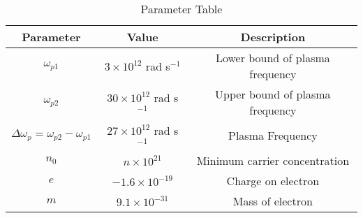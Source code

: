 \begin{table}[ht]
	  \centering
	    \begin{tabular}{|c|c|c|}
		        \hline
			   \textbf{ Parameter} & \textbf{Value} & \textbf{Description} \\
			       \hline
			           $\omega_{p1}$ & $3 \times 10^{12}$ rad s$^{-1}$ & Lower bound of plasma frequency \\
				       \hline
				            $\omega_{p2}$ & $30 \times 10^{12}$ rad s$^{-1}$ & Upper bound of plasma frequency \\
					        \hline
						    $\Delta\omega_p = \omega_{p2} - \omega_{p1}$  & $27 \times 10^{12}$ rad s$^{-1}$ & Plasma Frequency  \\
						        \hline
							    $n_0$ &  $n \times 10^{21}$ &  Minimum carrier concentration \\
							        \hline
								    $e$ &  $-1.6 \times 10^{-19}$ & Charge on electron \\
								        \hline
									    $m$ & $9.1 \times 10^{-31}$ & Mass of electron \\
									        \hline
										  \end{tabular}
										    \vspace{2mm}
										      \caption{Parameter Table}
										        \label{22_PH_35}
\end{table}

